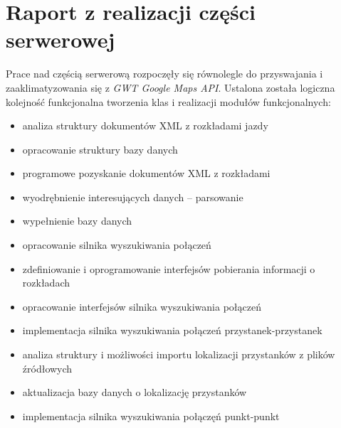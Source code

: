 \documentclass[a4paper,12pt]{article}
\begin{document}
\section{Raport z realizacji części serwerowej}
Prace nad częścią serwerową rozpoczęły się równolegle do przyswajania i
zaaklimatyzowania się z \emph{GWT Google Maps API}. Ustalona została logiczna
kolejność funkcjonalna tworzenia klas i realizacji modułów funkcjonalnych:
\begin{itemize}
  \item analiza struktury dokumentów XML z rozkładami jazdy 
  \item opracowanie struktury bazy danych
  \item programowe pozyskanie dokumentów XML z rozkładami
  \item wyodrębnienie interesujących danych -- parsowanie
  \item wypełnienie bazy danych
  \item opracowanie silnika wyszukiwania połączeń
  \item zdefiniowanie i oprogramowanie interfejsów pobierania informacji o
  rozkładach
  \item opracowanie interfejsów silnika wyszukiwania połączeń
  \item implementacja silnika wyszukiwania połączeń przystanek-przystanek
  \item analiza struktury i możliwości importu lokalizacji przystanków z plików
  źródłowych
  \item aktualizacja bazy danych o lokalizację przystanków 
  \item implementacja silnika wyszukiwania połączęń punkt-punkt 
\end{itemize}
\end{document}
